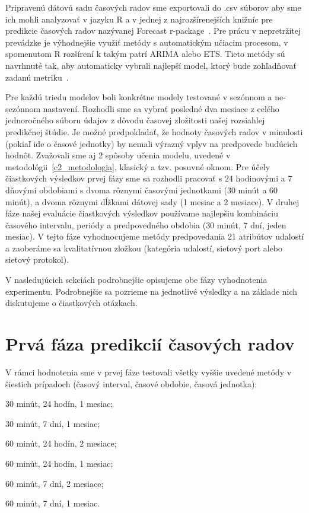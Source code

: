 \documentclass[thesismargins, thesislinespacing, openright, upjsfrontpage, combineabstracts]{rnthesis}
\begin{document}
Pripravenú dátovú sadu časových radov sme exportovali do .csv súborov aby sme ich mohli analyzovať v jazyku R a v jednej z najrozšírenejších knižníc pre predikcie časových radov nazývanej Forecast r-package~\cite{hyndman2007automatic}. Pre prácu v nepretržitej prevádzke je výhodnejšie využiť metódy s automatickým učiacim procesom, v spomenutom R rozšírení k takým patrí ARIMA alebo ETS. Tieto metódy sú navrhnuté tak, aby automaticky vybrali najlepší model, ktorý bude zohľadňovať zadanú metriku~\cite{hyndman2007automatic}.

Pre každú triedu modelov boli konkrétne modely testované v sezónnom a ne-sezónnom nastavení. Rozhodli sme sa vybrať posledné dva mesiace z celého jednoročného súboru údajov z dôvodu časovej zložitosti našej rozsiahlej predikčnej štúdie. Je možné predpokladať, že hodnoty časových radov v minulosti (pokiaľ ide o časové jednotky) by nemali výrazný vplyv na predpovede budúcich hodnôt. Zvažovali sme aj 2 spôsoby učenia modelu, uvedené v metodológii~\ref{c2_metodologia}, klasický a tzv. posuvné oknom. Pre účely čiastkových výsledkov prvej fázy sme sa rozhodli pracovať s 24 hodinovými a 7 dňovými obdobiami s dvoma rôznymi časovými jednotkami (30 minút a 60 minút), a dvoma rôznymi dĺžkami dátovej sady (1 mesiac a 2 mesiace). V druhej fáze našej evaluácie čiastkových výsledkov používame najlepšiu kombináciu časového intervalu, periódy a predpovedného obdobia (30 minút, 7 dní, jeden mesiac). V tejto fáze vyhodnocujeme metódy predpovedania 21 atribútov udalostí a zaoberáme sa kvalitatívnou zložkou (kategória udalostí, sieťový port alebo sieťový protokol).

V nasledujúcich sekciách podrobnejšie opisujeme obe fázy vyhodnotenia experimentu. Podrobnejšie sa pozrieme na jednotlivé výsledky a na základe nich diskutujeme o čiastkových otázkach.

\section{Prvá fáza predikcií časových radov}

V rámci hodnotenia sme v prvej fáze testovali všetky vyššie uvedené metódy v šiestich prípadoch (časový interval, časové obdobie, časová jednotka): 
\begin{compactenum}
    \item 30 minút, 24 hodín, 1 mesiac; 
    \item 30 minút, 7 dní, 1 mesiac; 
    \item 60 minút, 24 hodín, 2 mesiace; 
    \item 60 minút, 24 hodín, 1 mesiac; 
    \item 60 minút, 7 dní, 2 mesiace; 
    \item 60 minút, 7 dní, 1 mesiac.
\end{compactenum}
\end{document}
